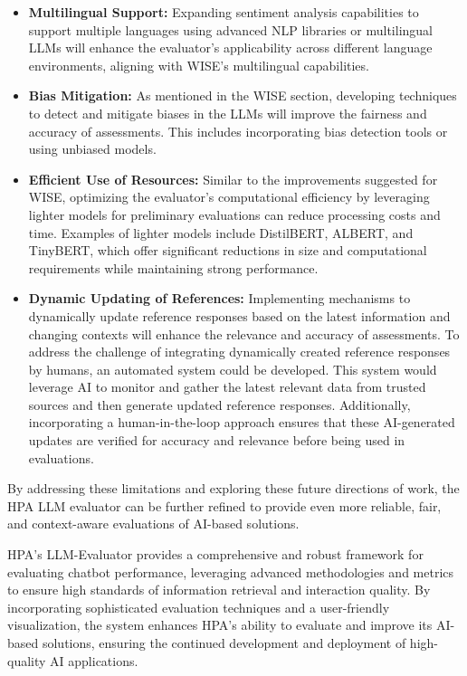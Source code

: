 \begin{itemize}
    \item \textbf{Multilingual Support:} Expanding sentiment analysis capabilities to support multiple languages using advanced NLP libraries or multilingual LLMs will enhance the evaluator's applicability across different language environments, aligning with WISE's multilingual capabilities. \cite{abdullah2021multilingual}
    \item \textbf{Bias Mitigation:} As mentioned in the WISE section, developing techniques to detect and mitigate biases in the LLMs will improve the fairness and accuracy of assessments. This includes incorporating bias detection tools or using unbiased models. \cite{ferrara2023fairness}
    \item \textbf{Efficient Use of Resources:} Similar to the improvements suggested for WISE, optimizing the evaluator's computational efficiency by leveraging lighter models for preliminary evaluations can reduce processing costs and time. Examples of lighter models include DistilBERT, ALBERT, and TinyBERT, which offer significant reductions in size and computational requirements while maintaining strong performance. \cite{sanh2019distilbert} \cite{lan2019albert} \cite{jiao2019tinybert}
    \item \textbf{Dynamic Updating of References:} Implementing mechanisms to dynamically update reference responses based on the latest information and changing contexts will enhance the relevance and accuracy of assessments. To address the challenge of integrating dynamically created reference responses by humans, an automated system could be developed. This system would leverage AI to monitor and gather the latest relevant data from trusted sources and then generate updated reference responses. Additionally, incorporating a human-in-the-loop approach ensures that these AI-generated updates are verified for accuracy and relevance before being used in evaluations. \cite{wu2022survey}
\end{itemize}

By addressing these limitations and exploring these future directions of work, the HPA LLM evaluator can be further refined to provide even more reliable, fair, and context-aware evaluations of AI-based solutions.

HPA's LLM-Evaluator provides a comprehensive and robust framework for evaluating chatbot performance, leveraging advanced methodologies and metrics to ensure high standards of information retrieval and interaction quality. By incorporating sophisticated evaluation techniques and a user-friendly visualization, the system enhances HPA's ability to evaluate and improve its AI-based solutions, ensuring the continued development and deployment of high-quality AI applications.
